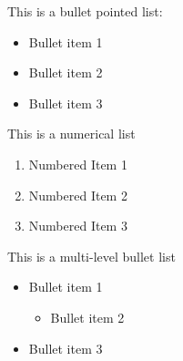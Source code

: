 \documentclass[10pt,a4paper]{article}
\begin{document}
This is a bullet pointed list:
\begin{itemize}
	\item{Bullet item 1}
	\item{Bullet item 2}
	\item{Bullet item 3}
\end{itemize}

This is a numerical list
\begin{enumerate}
	\item{Numbered Item 1}
	\item{Numbered Item 2}
	\item{Numbered Item 3}
\end{enumerate}

This is a multi-level bullet list
\begin{itemize}
	\item{Bullet item 1}
	\begin{itemize}
		\item{Bullet item 2}
	\end{itemize}
	\item{Bullet item 3}
\end{itemize}
\end{document}
